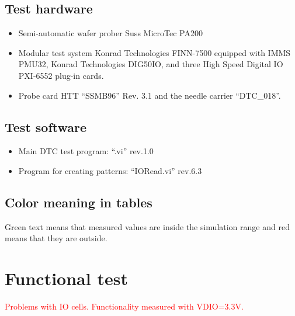 \section{Test hardware}

\begin{itemize}
\item Semi-automatic wafer prober Suss MicroTec PA200
\item Modular test system Konrad Technologies FINN-7500 equipped with IMMS PMU32, Konrad Technologies DIG50IO, and three High Speed Digital IO PXI-6552 plug-in cards. 
\item Probe card HTT “SSMB96” Rev. 3.1 and the needle carrier “DTC\_018”.
\end{itemize}

\section{Test software}
\begin{itemize}
\item Main DTC test program: “\CHIPID.vi” rev.1.0
\item Program for creating patterns: “IORead.vi” rev.6.3 
\end{itemize}


\section{Color meaning in tables}

Green text means that measured values are inside the simulation range and red means that they are outside. 




\chapter{Functional test}

\renewcommand{\VDIO}{3.3}
\textcolor{red}{Problems with IO cells. Functionality measured with VDIO=3.3V.}


\newpage

\newpage

\newpage

\renewcommand{\VDIO}{5}

